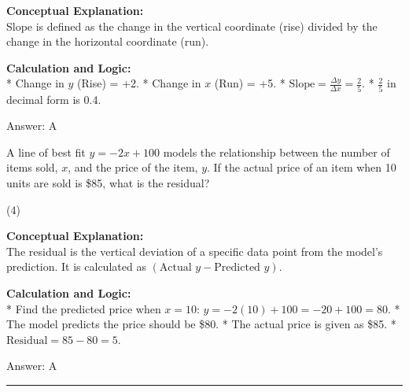 \documentclass[11pt,paper=a4,answers]{exam}
\begin{document}
\begin{questions}
\begin{solution}
\textbf{Conceptual Explanation:} \\
Slope is defined as the change in the vertical coordinate (rise) divided by the change in the horizontal coordinate (run).

\vspace{30pt}

\textbf{Calculation and Logic:} \\
* Change in $y$ (Rise) = +2.
* Change in $x$ (Run) = +5.
* $\text{Slope} = \frac{\Delta y}{\Delta x} = \frac{2}{5}$.
* $\frac{2}{5}$ in decimal form is 0.4.

\vspace{30pt}

Answer: \colorbox{yellow!100}{A}
\end{solution}

\vspace{60pt}

\question
A line of best fit $y = -2x + 100$ models the relationship between the number of items sold, $x$, and the price of the item, $y$. If the actual price of an item when 10 units are sold is \$85, what is the residual?
\begin{tasks}(4)
\end{tasks}

\begin{solution}
\textbf{Conceptual Explanation:} \\
The residual is the vertical deviation of a specific data point from the model's prediction. It is calculated as $(\text{Actual } y - \text{Predicted } y)$.

\vspace{30pt}

\textbf{Calculation and Logic:} \\
* Find the predicted price when $x = 10$: $y = -2(10) + 100 = -20 + 100 = 80$.
* The model predicts the price should be \$80.
* The actual price is given as \$85.
* $\text{Residual} = 85 - 80 = 5$.

\vspace{30pt}

Answer: \colorbox{yellow!100}{A}
\end{solution}

\end{questions}
\begin{center}
\rule{.5\textwidth}{1pt}
\end{center}
\end{document}
